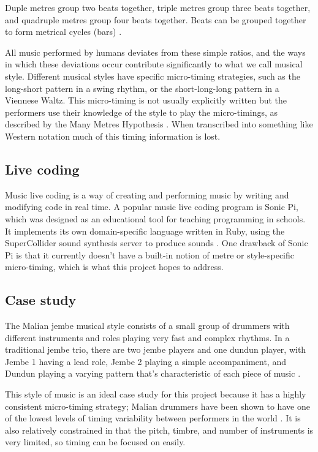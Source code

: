 \documentclass[12pt,twoside,openright]{report}
\begin{document}
\begin{refsection}
Duple metres group two beats together, triple metres group three beats together,
and quadruple metres group four beats together. Beats can be grouped together to
form metrical cycles (bars) \cite{omt2021}.

All music performed by humans deviates from these simple ratios, and the ways in
which these deviations occur contribute significantly to what we call musical
style. Different musical styles have specific micro-timing strategies, such as
the long-short pattern in a swing rhythm, or the short-long-long pattern in a
Viennese Waltz. This micro-timing is not usually explicitly written but the
performers use their knowledge of the style to play the micro-timings, as
described by the Many Metres Hypothesis \cite{london2012}. When transcribed into something
like Western notation much of this timing information is lost.


\subsection*{Live coding}

Music live coding is a way of creating and performing music by writing and
modifying code in real time. A popular music live coding program is Sonic Pi,
which was designed as an educational tool for teaching programming in schools.
It implements its own domain-specific language written in Ruby, using the
SuperCollider sound synthesis server to produce sounds \cite{aaron2013}. One drawback of
Sonic Pi is that it currently doesn't have a built-in notion of metre or
style-specific micro-timing, which is what this project hopes to address.


\subsection*{Case study}

The Malian jembe musical style consists of a small group of drummers with
different instruments and roles playing very fast and complex rhythms. In a
traditional jembe trio, there are two jembe players and one dundun player, with
Jembe 1 having a lead role, Jembe 2 playing a simple accompaniment, and Dundun
playing a varying pattern that's characteristic of each piece of music \cite{jacoby2021}.

This style of music is an ideal case study for this project because it has a
highly consistent micro-timing strategy; Malian drummers have been shown to have
one of the lowest levels of timing variability between performers in the world
\cite{jacoby2021}. It is also relatively constrained in that the pitch, timbre, and number of
instruments is very limited, so timing can be focused on easily.


\end{refsection}
\end{document}
